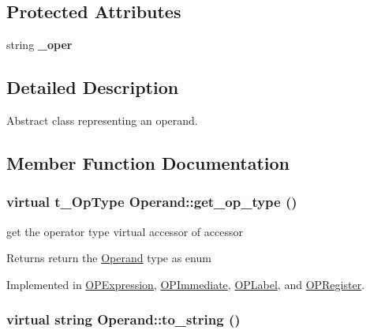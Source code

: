 \subsection*{Protected Attributes}
\begin{DoxyCompactItemize}
\item 
\hypertarget{classOperand_af70a183445064a0106d41dfeea681790}{
string {\bfseries \_\-oper}}
\label{classOperand_af70a183445064a0106d41dfeea681790}

\end{DoxyCompactItemize}


\subsection{Detailed Description}
Abstract class representing an operand. 

\subsection{Member Function Documentation}
\hypertarget{classOperand_afd469e305a467e2574f34ac9bd6c62b0}{
\subsubsection[{get\_\-op\_\-type}]{\setlength{\rightskip}{0pt plus 5cm}virtual t\_\-OpType Operand::get\_\-op\_\-type ()}}
\label{classOperand_afd469e305a467e2574f34ac9bd6c62b0}


get the operator type virtual accessor of accessor \begin{DoxyReturn}{Returns}
return the \hyperlink{classOperand}{Operand} type as enum 
\end{DoxyReturn}


Implemented in \hyperlink{classOPExpression_a06f8902130516437d5d93c43a5efcbd2}{OPExpression}, \hyperlink{classOPImmediate_aed01353798ae57936a9f77dd05eafa88}{OPImmediate}, \hyperlink{classOPLabel_a1a6ec701c549a6475d44ffcced1c23b5}{OPLabel}, and \hyperlink{classOPRegister_a1be03d6e6422510a1fd12d1f13dfd601}{OPRegister}.\hypertarget{classOperand_a28aed96d5fafee66be81c30c1435ad00}{
\subsubsection[{to\_\-string}]{\setlength{\rightskip}{0pt plus 5cm}virtual string Operand::to\_\-string ()}}
\label{classOperand_a28aed96d5fafee66be81c30c1435ad00}


